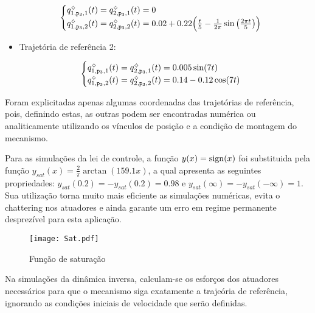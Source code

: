 \begin{itemize}
$$ \begin{cases}
q_{1,\mathtt{p}_3,1}^{\scriptscriptstyle \diamondsuit}(t) = q_{2,\mathtt{p}_3,1}^{\scriptscriptstyle \diamondsuit}(t) = 0 \\
q_{1,\mathtt{p}_3,2}^{\scriptscriptstyle \diamondsuit}(t) = q_{2,\mathtt{p}_3,2}^{\scriptscriptstyle \diamondsuit}(t) = 0.02 + 0.22 \Big( \frac{t}{5} - \frac{1}{2\pi} \sin \big( \frac{2\pi t}{5} \big) \Big) \\
\end{cases}$$

\item Trajet\'oria de refer\^encia 2:

$$ \begin{cases}
q_{1,\mathtt{p}_3,1}^{\scriptscriptstyle \diamondsuit}(t) = q_{2,\mathtt{p}_3,1}^{\scriptscriptstyle \diamondsuit}(t) = 0.005 \sin(7t) \\
q_{1,\mathtt{p}_3,2}^{\scriptscriptstyle \diamondsuit}(t) = q_{2,\mathtt{p}_3,2}^{\scriptscriptstyle \diamondsuit}(t) = 0.14 - 0.12 \cos(7t) \\
\end{cases}$$

\end{itemize}

Foram explicitadas apenas algumas coordenadas das trajet\'orias de refer\^encia, pois, definindo estas, as outras podem ser encontradas num\'erica ou analiticamente utilizando os v\'inculos de posi\c{c}\~ao e a condi\c{c}\~ao de montagem do mecanismo.

Para as simula\c{c}\~oes da lei de controle, a fun\c{c}\~ao $y(x) = \operatorname*{sign}(x)$ foi substituida pela fun\c{c}\~ao $y_{sat}(x) = \frac{2}{\pi}\arctan(159.1 x)$, a qual apresenta as seguintes propriedades: $y_{sat}(0.2) = -y_{sat}(0.2) = 0.98$ e $y_{sat}(\infty) = - y_{sat}(-\infty) = 1$. Sua utiliza\c{c}\~ao torna muito mais eficiente as simula\c{c}\~oes num\'ericas, evita o chattering nos atuadores e ainda garante um erro em regime permanente desprez\'ivel para esta aplica\c{c}\~ao.

\begin{figure}[H]
	\centering
	\texttt{[image: Sat.pdf]}
	\caption{Fun\c{c}\~ao de satura\c{c}\~ao}
	\label{Sat}
\end{figure}

Na simula\c{c}\~oes da din\^amica inversa, calculam-se os esfor\c{c}os dos atuadores necess\'arios para que o mecanismo siga exatamente a traje\'oria de refer\^encia, ignorando as condi\c{c}\~oes iniciais de velocidade que ser\~ao definidas.

